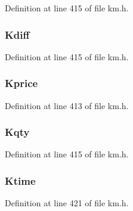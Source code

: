 Definition at line 415 of file km.\+h.

\subsubsection[{\texorpdfstring{Kdiff}{Kdiff}}]{ Kdiff}\hypertarget{struct_k_1_1m_trade_afc10958762dbc38c54aa501fcc84d42a}{}\label{struct_k_1_1m_trade_afc10958762dbc38c54aa501fcc84d42a}


Definition at line 415 of file km.\+h.

\subsubsection[{\texorpdfstring{Kprice}{Kprice}}]{ Kprice}\hypertarget{struct_k_1_1m_trade_affef8ad6bfa3b7c819981e40a4786444}{}\label{struct_k_1_1m_trade_affef8ad6bfa3b7c819981e40a4786444}


Definition at line 413 of file km.\+h.

\subsubsection[{\texorpdfstring{Kqty}{Kqty}}]{ Kqty}\hypertarget{struct_k_1_1m_trade_ab4611562283514c0ca59af939c5c9abe}{}\label{struct_k_1_1m_trade_ab4611562283514c0ca59af939c5c9abe}


Definition at line 415 of file km.\+h.

\subsubsection[{\texorpdfstring{Ktime}{Ktime}}]{ Ktime}\hypertarget{struct_k_1_1m_trade_a55e39653e425359e6d8f7de1e6e792de}{}\label{struct_k_1_1m_trade_a55e39653e425359e6d8f7de1e6e792de}


Definition at line 421 of file km.\+h.

